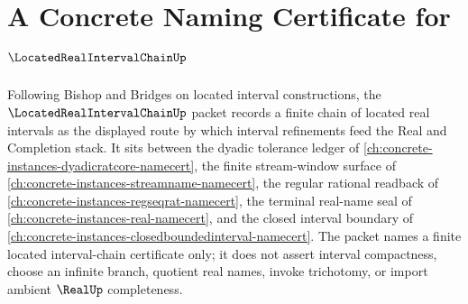 \chapter{A Concrete Naming Certificate for $\LocatedRealIntervalChainUp$}
\label{ch:concrete-instances-located-real-interval-chain-namecert}

Following Bishop and Bridges on located interval constructions, the $\LocatedRealIntervalChainUp$ packet records a finite chain of located real intervals as the displayed route by which interval refinements feed the Real and Completion stack. It sits between the dyadic tolerance ledger of \autoref{ch:concrete-instances-dyadicratcore-namecert}, the finite stream-window surface of \autoref{ch:concrete-instances-streamname-namecert}, the regular rational readback of \autoref{ch:concrete-instances-regseqrat-namecert}, the terminal real-name seal of \autoref{ch:concrete-instances-real-namecert}, and the closed interval boundary of \autoref{ch:concrete-instances-closedboundedinterval-namecert}. The packet names a finite located interval-chain certificate only; it does not assert interval compactness, choose an infinite branch, quotient real names, invoke trichotomy, or import ambient $\RealUp$ completeness.

